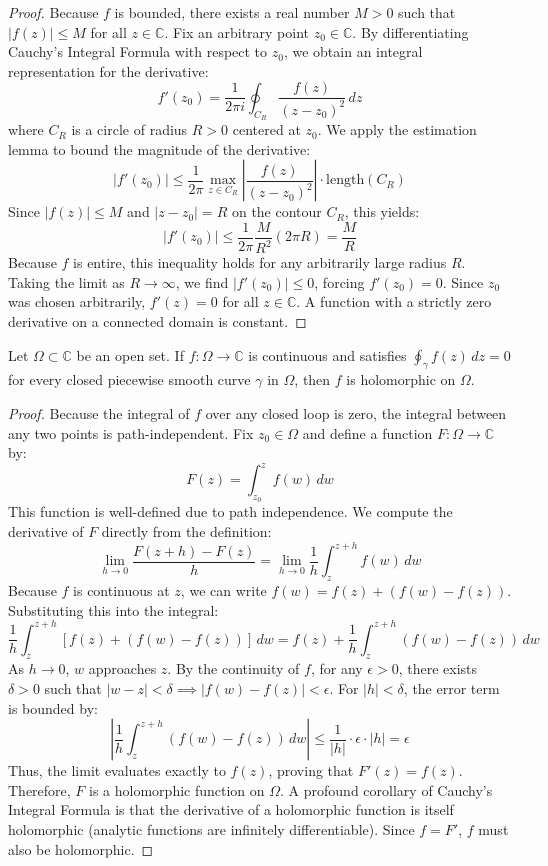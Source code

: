 \begin{proof}
Because $f$ is bounded, there exists a real number $M > 0$ such that $|f(z)| \le M$ for all $z \in \mathbb{C}$. Fix an arbitrary point $z_0 \in \mathbb{C}$. By differentiating Cauchy's Integral Formula with respect to $z_0$, we obtain an integral representation for the derivative:
$$ f'(z_0) = \frac{1}{2\pi i} \oint_{C_R} \frac{f(z)}{(z - z_0)^2} \, dz $$
where $C_R$ is a circle of radius $R > 0$ centered at $z_0$. We apply the estimation lemma to bound the magnitude of the derivative:
$$ |f'(z_0)| \le \frac{1}{2\pi} \max_{z \in C_R} \left| \frac{f(z)}{(z - z_0)^2} \right| \cdot \text{length}(C_R) $$
Since $|f(z)| \le M$ and $|z - z_0| = R$ on the contour $C_R$, this yields:
$$ |f'(z_0)| \le \frac{1}{2\pi} \frac{M}{R^2} (2\pi R) = \frac{M}{R} $$
Because $f$ is entire, this inequality holds for any arbitrarily large radius $R$. Taking the limit as $R \to \infty$, we find $|f'(z_0)| \le 0$, forcing $f'(z_0) = 0$. Since $z_0$ was chosen arbitrarily, $f'(z) = 0$ for all $z \in \mathbb{C}$. A function with a strictly zero derivative on a connected domain is constant.
\end{proof}

\begin{theorem}
Let $\Omega \subset \mathbb{C}$ be an open set. If $f: \Omega \to \mathbb{C}$ is continuous and satisfies $\oint_\gamma f(z) \, dz = 0$ for every closed piecewise smooth curve $\gamma$ in $\Omega$, then $f$ is holomorphic on $\Omega$.
\end{theorem}

\begin{proof}
Because the integral of $f$ over any closed loop is zero, the integral between any two points is path-independent. Fix $z_0 \in \Omega$ and define a function $F: \Omega \to \mathbb{C}$ by:
$$ F(z) = \int_{z_0}^z f(w) \, dw $$
This function is well-defined due to path independence. We compute the derivative of $F$ directly from the definition:
$$ \lim_{h \to 0} \frac{F(z + h) - F(z)}{h} = \lim_{h \to 0} \frac{1}{h} \int_z^{z+h} f(w) \, dw $$
Because $f$ is continuous at $z$, we can write $f(w) = f(z) + (f(w) - f(z))$. Substituting this into the integral:
$$ \frac{1}{h} \int_z^{z+h} [f(z) + (f(w) - f(z))] \, dw = f(z) + \frac{1}{h} \int_z^{z+h} (f(w) - f(z)) \, dw $$
As $h \to 0$, $w$ approaches $z$. By the continuity of $f$, for any $\epsilon > 0$, there exists $\delta > 0$ such that $|w - z| < \delta \implies |f(w) - f(z)| < \epsilon$. For $|h| < \delta$, the error term is bounded by:
$$ \left| \frac{1}{h} \int_z^{z+h} (f(w) - f(z)) \, dw \right| \le \frac{1}{|h|} \cdot \epsilon \cdot |h| = \epsilon $$
Thus, the limit evaluates exactly to $f(z)$, proving that $F'(z) = f(z)$. Therefore, $F$ is a holomorphic function on $\Omega. $ A profound corollary of Cauchy's Integral Formula is that the derivative of a holomorphic function is itself holomorphic (analytic functions are infinitely differentiable). Since $f = F'$, $f$ must also be holomorphic.
\end{proof}